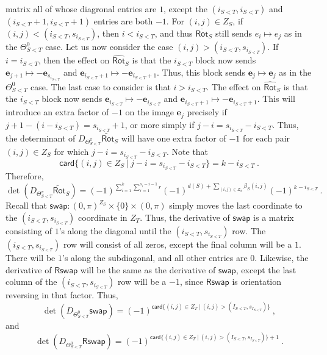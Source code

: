 \documentclass{article}
\newcommand{\msf}[1]{\mathsf{#1}}
\newcommand{\mbf}[1]{\mathbf{#1}}
\newcommand{\rot}{\msf{Rot}}
\newcommand{\trot}{\widetilde{\msf{Rot}}}
\newcommand{\card}{\msf{card}}
\newcommand{\e}{\mbf{e}}
\theoremstyle{definition}
\begin{document}
matrix all of whose diagronal entries are $1$, except the $(i_{S<T},i_{S<T})$ and $(i_{S<T}+1,i_{S<T}+1)$
entries are both $-1$. For $(i,j) \in Z_S$, if $(i,j)<(i_{S<T}, s_{i_{S<T}})$, then $i<i_{S<T}$, and thus 
$\overline{\rot}_S$ still sends $e_i \mapsto e_j$ as in the $\Theta_{S<T}^0$ case. 
Let us now consider the case $(i,j)>(i_{S<T},s_{i_{S<T}})$. If $i=i_{S<T}$, then the effect on
$\widehat{\rot}_S$ is that the $i_{S<T}$ block 
now sends $\e_{j+1} \mapsto -\e_{s_{i_{S<T}}}$ and $\e_{i_{S<T}+1} \mapsto -\e_{i_{S<T}+1}$. Thus,
this block sends $\e_j \mapsto \e_j$ as in the $\Theta^0_{S<T}$ case. The last case to consider is that
$i>i_{S<T}$. The effect on $\widehat{\rot}_S$ is that the $i_{S<T}$ block now sends 
$\e_{i_{S<T}} \mapsto -\e_{i_{S<T}}$ and $\e_{i_{S<T}+1} \mapsto -\e_{i_{S<T}+1}$. This will introduce an
extra factor of $-1$ on the image $\e_j$ precisely if $j+1-(i-i_{S<T}) = s_{i_{S<T}}+1$, 
or more simply if $j-i=s_{i_{S<T}}-i_{S<T}$. Thus, the determinant of $D_{\Theta^\pi_{S<T}}\trot_S$ will have
one extra factor of $-1$ for each pair $(i,j) \in Z_S$ for which $j-i=s_{i_{S<T}}-i_{S<T}$. Note that
$$\card\{(i,j) \in Z_S ~|~ j-i=s_{i_{S<T}}-i_{S<T}\} = k-i_{S<T}~.$$
Therefore, 
$$\det(D_{\Theta^\pi_{S<T}}\trot_S) = (-1)^{\sum\limits_{i=1}^k\sum\limits_{r=1}^{s_i-i-1} r}
    (-1)^{d(S)+\sum\limits_{(i,j)\in Z_S} \beta_S(i,j)}(-1)^{k-i_{S<T}}~.$$
Recall that $\msf{swap}:(0,\pi)^{Z_S} \times \{0\} \times (0,\pi)$ simply moves the last coordinate to the 
$(i_{S<T},s_{i_{S<T}})$ coordinate in $Z_T$. Thus,
the derivative of $\msf{swap}$ is a matrix consisting of $1$'s along the diagonal until the 
$(i_{S<T},s_{i_{S<T}})$ row.
The $(i_{S<T},s_{i_{S<T}})$ row will consist of all zeros, except the final column will be a $1$. There will be $1$'s
along the subdiagonal, and all other entries are 0. Likewise, the derivative of $\msf{Rswap}$ will be the same as
the derivative of $\msf{swap}$, except the last column of the $(i_{S<T},s_{i_{S<T}})$ row will be a $-1$, since
$\msf{Rswap}$ is orientation reversing in that factor. Thus, 
$$\det(D_{\Theta_{S<T}^0}\msf{swap}) = (-1)^{\card\{(i,j) \in Z_T ~|~ (i,j)>(I_{S<T},s_{I_{S<T}})\}}~,$$
and 
$$\det(D_{\Theta_{S<T}^0}\msf{Rswap}) = (-1)^{\card\{(i,j) \in Z_T ~|~ (i,j)>(I_{S<T},s_{I_{S<T}})\}+1}~.$$
\end{document}
